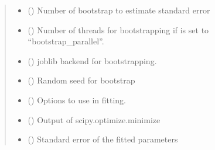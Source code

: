 \documentclass[letterpaper,10pt,english]{sphinxmanual}
\begin{document}
\begin{fulllineitems}
\begin{fulllineitems}
\begin{quote}
\begin{description}
\begin{itemize}
\item {}
\sphinxAtStartPar
{} () \textendash{} Number of bootstrap to estimate standard error

\item {}
\sphinxAtStartPar
{} () \textendash{} Number of threads for bootstrapping if  is set to
“bootstrap\_parallel”.

\item {}
\sphinxAtStartPar
{} () \textendash{} joblib backend for bootstrapping.

\item {}
\sphinxAtStartPar
{} () \textendash{} Random seed for bootstrap

\item {}
\sphinxAtStartPar
{} () \textendash{} Options to use in fitting.

\end{itemize}

\sphinxAtStartPar
{}

\sphinxAtStartPar
\begin{itemize}
\item {}
\sphinxAtStartPar
{} () \textendash{} Output of scipy.optimize.minimize

\item {}
\sphinxAtStartPar
{} () \textendash{} Standard error of the fitted parameters


\end{itemize}
\end{description}
\end{quote}
\end{fulllineitems}
\end{fulllineitems}
\end{document}
